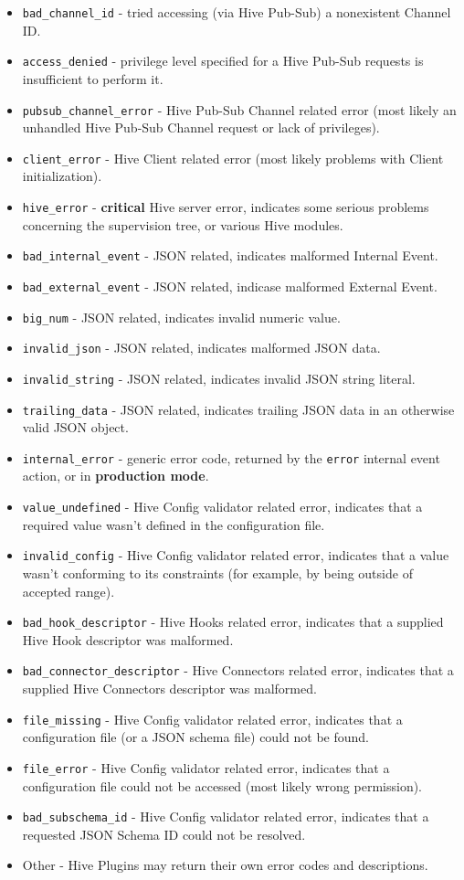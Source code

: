 \documentclass[a4paper]{article}
\begin{document}
\begin{itemize}
\item \texttt{bad\_channel\_id} - tried accessing (via Hive Pub-Sub) a nonexistent Channel ID.
\item \texttt{access\_denied} - privilege level specified for a Hive Pub-Sub requests is insufficient to perform it.
\item \texttt{pubsub\_channel\_error} - Hive Pub-Sub Channel related error (most likely an unhandled Hive Pub-Sub Channel request or lack of privileges).
\item \texttt{client\_error} - Hive Client related error (most likely problems with Client initialization).
\item \texttt{hive\_error} - \textbf{critical} Hive server error, indicates some serious problems concerning the supervision tree, or various Hive modules.
\item \texttt{bad\_internal\_event} - JSON related, indicates malformed Internal Event.
\item \texttt{bad\_external\_event} - JSON related, indicase malformed External Event.
\item \texttt{big\_num} - JSON related, indicates invalid numeric value.
\item \texttt{invalid\_json} - JSON related, indicates malformed JSON data.
\item \texttt{invalid\_string} - JSON related, indicates invalid JSON string literal.
\item \texttt{trailing\_data} - JSON related, indicates trailing JSON data in an otherwise valid JSON object.
\item \texttt{internal\_error} - generic error code, returned by the \texttt{error} internal event action, or in \textbf{production mode}.
\item \texttt{value\_undefined} - Hive Config validator related error, indicates that a required value wasn't defined in the configuration file.
\item \texttt{invalid\_config} - Hive Config validator related error, indicates that a value wasn't conforming to its constraints (for example, by being outside of accepted range).
\item \texttt{bad\_hook\_descriptor} - Hive Hooks related error, indicates that a supplied Hive Hook descriptor was malformed.
\item \texttt{bad\_connector\_descriptor} - Hive Connectors related error, indicates that a supplied Hive Connectors descriptor was malformed.
\item \texttt{file\_missing} - Hive Config validator related error, indicates that a configuration file (or a JSON schema file) could not be found.
\item \texttt{file\_error} - Hive Config validator related error, indicates that a configuration file could not be accessed (most likely wrong permission).
\item \texttt{bad\_subschema\_id} - Hive Config validator related error, indicates that a requested JSON Schema ID could not be resolved.
\item Other - Hive Plugins may return their own error codes and descriptions.
\end{itemize}
\end{document}
